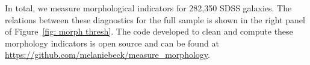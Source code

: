 \documentclass[twocolumn,  trackchanges, ]{aastex6}%
\newcommand\aastex{AAS\TeX}
\begin{document}
In total, we measure morphological indicators for 282,350 SDSS galaxies. The relations between these diagnostics for the full sample is shown in the right panel of Figure~\ref{fig: morph thresh}. The code developed to clean and compute these morphology indicators is open source and can be found at \url{https://github.com/melaniebeck/measure_morphology}.










\listofchanges
\end{document}
